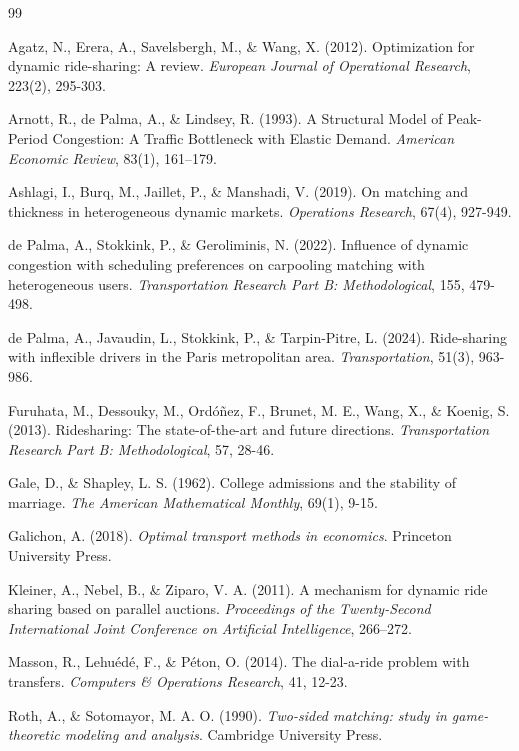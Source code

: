 \documentclass[11pt,a4paper]{article}
\begin{document}
\begin{thebibliography}{99}

 Agatz, N., Erera, A., Savelsbergh, M., \& Wang, X. (2012). Optimization for dynamic ride-sharing: A review. \textit{European Journal of Operational Research}, 223(2), 295-303.

 Arnott, R., de Palma, A., \& Lindsey, R. (1993). A Structural Model of Peak-Period Congestion: A Traffic Bottleneck with Elastic Demand. \textit{American Economic Review}, 83(1), 161–179.

 Ashlagi, I., Burq, M., Jaillet, P., \& Manshadi, V. (2019). On matching and thickness in heterogeneous dynamic markets. \textit{Operations Research}, 67(4), 927-949.

 de Palma, A., Stokkink, P., \& Geroliminis, N. (2022). Influence of dynamic congestion with scheduling preferences on carpooling matching with heterogeneous users. \textit{Transportation Research Part B: Methodological}, 155, 479-498.

 de Palma, A., Javaudin, L., Stokkink, P., \& Tarpin-Pitre, L. (2024). Ride-sharing with inflexible drivers in the Paris metropolitan area. \textit{Transportation}, 51(3), 963-986.

 Furuhata, M., Dessouky, M., Ordóñez, F., Brunet, M. E., Wang, X., \& Koenig, S. (2013). Ridesharing: The state-of-the-art and future directions. \textit{Transportation Research Part B: Methodological}, 57, 28-46.

 Gale, D., \& Shapley, L. S. (1962). College admissions and the stability of marriage. \textit{The American Mathematical Monthly}, 69(1), 9-15.

 Galichon, A. (2018). \textit{Optimal transport methods in economics}. Princeton University Press.

 Kleiner, A., Nebel, B., \& Ziparo, V. A. (2011). A mechanism for dynamic ride sharing based on parallel auctions. \textit{Proceedings of the Twenty-Second International Joint Conference on Artificial Intelligence}, 266–272.

 Masson, R., Lehuédé, F., \& Péton, O. (2014). The dial-a-ride problem with transfers. \textit{Computers \& Operations Research}, 41, 12-23.

 Roth, A., \& Sotomayor, M. A. O. (1990). \textit{Two-sided matching: study in game-theoretic modeling and analysis}. Cambridge University Press.


\end{thebibliography}
\end{document}
